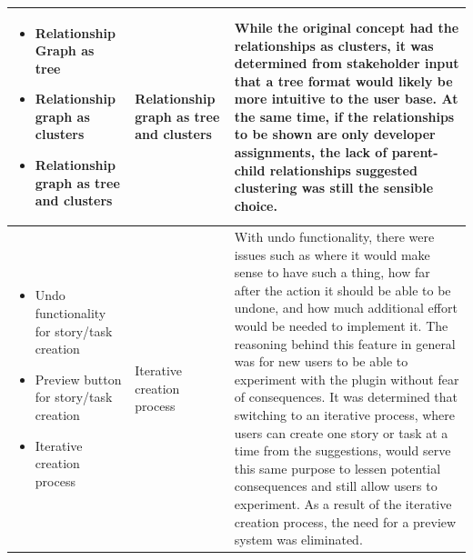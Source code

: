 \begin{table}[h]
\begin{tabularx}{\textwidth}{|p{3cm}|p{3cm}|X|}
	\hline
	\begin{itemize}
		\item Relationship Graph as tree
		\item Relationship graph as clusters
		\item Relationship graph as tree and clusters
	\end{itemize} & 
	Relationship graph as tree and clusters & While the original concept had the relationships as clusters, it was determined from stakeholder input that a tree format would likely be more intuitive to the user base. At the same time, if the relationships to be shown are only developer assignments, the lack of parent-child relationships suggested clustering was still the sensible choice.\\
	\hline
	\begin{itemize}
		\item Undo functionality for story/task creation
		\item Preview button for story/task creation
		\item Iterative creation process
	\end{itemize} & 
	Iterative creation process & With undo functionality, there were issues such as where it would make sense to have such a thing, how far after the action it should be able to be undone, and how much additional effort would be needed to implement it. The reasoning behind this feature in general was for new users to be able to experiment with the plugin without fear of consequences. It was determined that switching to an iterative process, where users can create one story or task at a time from the suggestions, would serve this same purpose to lessen potential consequences and still allow users to experiment. As a result of the iterative creation process, the need for a preview system was eliminated.\\
	\hline
	\end{tabularx}
\label{tab:UIUXDesignChoices}
\end{table}